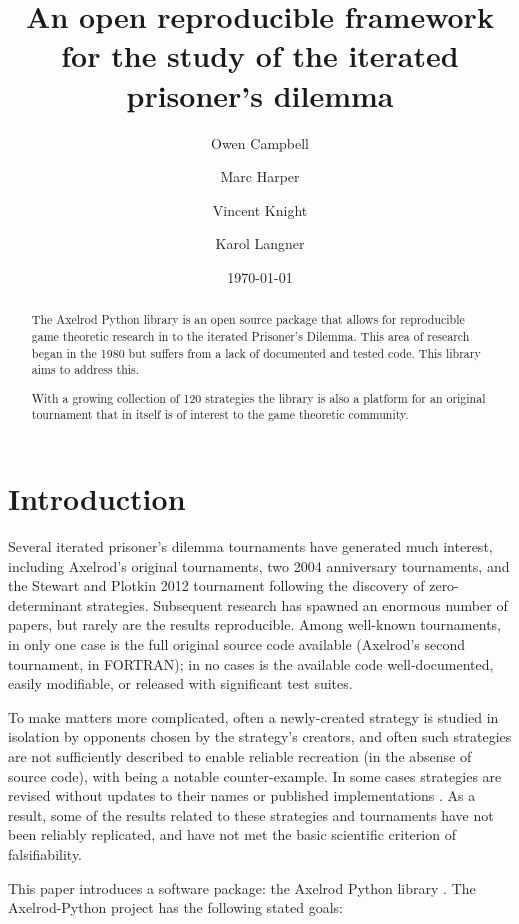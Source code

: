 \documentclass{article}
\title{An open reproducible framework for the study of the iterated prisoner's
dilemma}
\author{Owen Campbell\\
        \and
        Marc Harper\\
        \and
        Vincent Knight\\
        \and
        Karol Langner\\
}
\date{\today}
\begin{document}
\maketitle

\begin{abstract}
    The Axelrod Python library is an open source package that allows for
    reproducible game theoretic research in to the iterated Prisoner's Dilemma.
    This area of research began in the 1980 but suffers from a lack of
    documented and tested code. This library aims to address this.

    With a growing collection of 120 strategies the library is also a platform
    for an original tournament that in itself is of interest to the game
    theoretic community.
\end{abstract}


\section{Introduction}\label{sec:introduction}

Several iterated prisoner's dilemma tournaments have generated much interest,
including Axelrod's original tournaments, two 2004 anniversary tournaments, and
the Stewart and Plotkin 2012 tournament \cite{Stewart2012} following the
discovery of zero-determinant strategies.  Subsequent research has spawned an
enormous number of papers, but rarely are the results reproducible. Among
well-known tournaments, in only one case is the full original source code
available (Axelrod's second tournament, in FORTRAN); in no cases is the
available code well-documented, easily modifiable, or released with significant
test suites.

To make matters more complicated, often a newly-created strategy is studied in
isolation by opponents chosen by the strategy's creators, and often such
strategies are not sufficiently described to enable reliable recreation
(in the absense of source code), with \cite{slany2007some} being a notable
counter-example. In some cases strategies are revised without updates to their
names or published implementations \cite{li2007design, li2011engineering}.
As a result, some of the results related to these strategies and tournaments
have not been reliably replicated, and have not met the basic scientific
criterion of falsifiability.

This paper introduces a software package: the Axelrod Python library
\cite{Axelrod-Pythonprojectteam2015}. The Axelrod-Python project has the
following stated goals:
\end{document}
